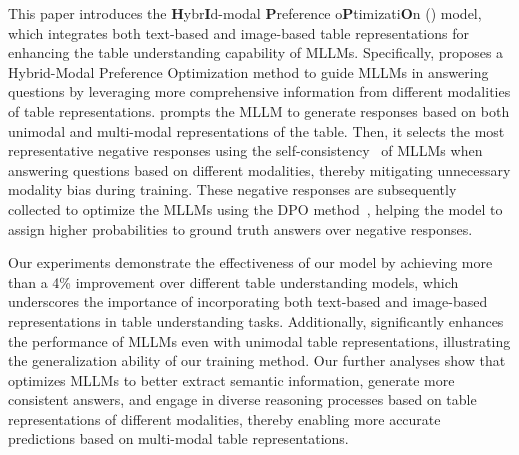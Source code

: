 This paper introduces the \textbf{H}ybr\textbf{I}d-modal \textbf{P}reference o\textbf{P}timizati\textbf{O}n (\method{}) model, which integrates both text-based and image-based table representations for enhancing the table understanding capability of MLLMs. Specifically, \method{} proposes a Hybrid-Modal Preference Optimization method to guide MLLMs in answering questions by leveraging more comprehensive information from different modalities of table representations. \method{} prompts the MLLM to generate responses based on both unimodal and multi-modal representations of the table. Then, it selects the most representative negative responses using the self-consistency~\cite{liu-etal-2024-rethinking} of MLLMs when answering questions based on different modalities, thereby mitigating unnecessary modality bias during training. These negative responses are subsequently collected to optimize the MLLMs using the DPO method~\cite{rafailov2023direct}, helping the model to assign higher probabilities to ground truth answers over negative responses.

Our experiments demonstrate the effectiveness of our \method{} model by achieving more than a 4\% improvement over different table understanding models, which underscores the importance of incorporating both text-based and image-based representations in table understanding tasks. Additionally, \method{} significantly enhances the performance of MLLMs even with unimodal table representations, illustrating the generalization ability of our training method. Our further analyses show that \method{} optimizes MLLMs to better extract semantic information, generate more consistent answers, and engage in diverse reasoning processes based on table representations of different modalities, thereby enabling more accurate predictions based on multi-modal table representations.